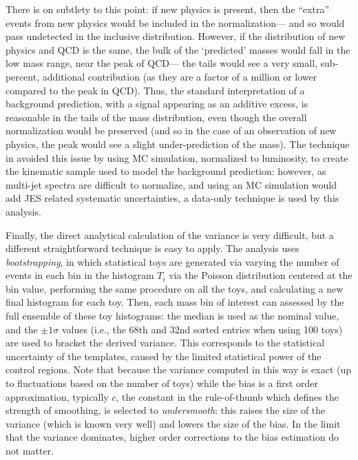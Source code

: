 There is on subtlety to this point: if new physics is present, then the ``extra'' events from new physics would be included in the normalization--- and so would pass undetected in the inclusive distribution. However, if the \pt distribution of new physics and QCD is the same, the bulk of the `predicted' masses would fall in the low mass range, near the peak of QCD--- the tails would see a very small, sub-percent, additional contribution (as they are a factor of a million or lower compared to the peak in QCD). Thus, the standard interpretation of a background prediction, with a signal appearing as an additive excess, is reasonable in the tails of the mass distribution, even though the overall normalization would be preserved (and so in the case of an observation of new physics, the peak would see a slight under-prediction of the mass). The technique in \cite{MassTemplates} avoided this issue by using MC simulation, normalized to luminosity, to create the kinematic sample used to model the background prediction: however, as multi-jet \pt spectra are difficult to normalize, and using an MC simulation would add JES related systematic uncertainties, a data-only technique is used by this analysis.

Finally, the direct analytical calculation of the variance is very difficult, but a different straightforward technique is easy to apply. The analysis uses \textit{bootstrapping}, in which  statistical toys are generated via varying the number of events in each bin in the histogram $T_i$ via the Poisson distribution centered at the bin value, performing the same procedure on all the toys, and calculating a new final histogram for each toy. Then, each mass bin of interest can assessed by the full ensemble of these toy histograms: the median is used as the nominal value, and the $\pm 1\sigma$ values (i.e., the 68th and 32nd sorted entries when using 100 toys) are used to bracket the derived variance. This corresponds to the statistical uncertainty of the templates, caused by the limited statistical power of the control regions. Note that because the variance computed in this way is exact (up to fluctuations based on the number of toys) while the bias is a first order approximation, typically $c$, the constant in the rule-of-thumb which defines the strength of smoothing, is selected to \textit{undersmooth}: this raises the size of the variance (which is known very well) and lowers the size of the bias. In the limit that the variance dominates, higher order corrections to the bias estimation do not matter.

